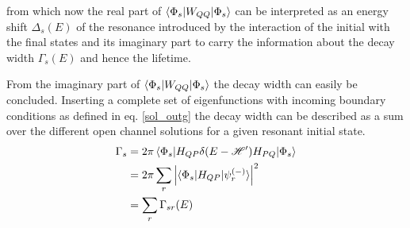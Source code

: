 from which now the real part of $\braket{\Phi_s|W_{QQ}|\Phi_s}$ can be interpreted 
as an energy shift $\Delta_s(E)$ of the resonance introduced by the interaction of the initial
with the final states and its imaginary part to carry the information about the
decay width $\Gamma_s(E)$ and hence the lifetime.


From the imaginary part of $\braket{\Phi_s|W_{QQ}|\Phi_s}$ the decay width can
easily be concluded. Inserting a complete set
of eigenfunctions with incoming boundary conditions as defined in
eq. \ref{sol_outg} the decay width can be described
as a sum over the different open channel solutions for a given resonant initial state.
\begin{align}
  \Gamma_s & = 2 \pi \braket{\Phi_s|H_{QP}\delta(E-\mathscr{H}')H_{PQ}|\Phi_s}\\
           & = 2 \pi \sum\limits_r \left | \braket{\Phi_s|H_{QP}|\psi_r^{(-)}} \right|^2\\
           & = \sum\limits_r \Gamma_{sr}(E)
\end{align}
